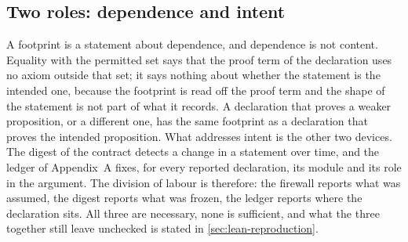 \subsection{Two roles: dependence and intent}

A footprint is a statement about dependence, and dependence is not content.
Equality with the permitted set says that the proof term of the declaration uses
no axiom outside that set; it says nothing about whether the statement is the
intended one, because the footprint is read off the proof term and the shape of
the statement is not part of what it records. A declaration that proves a weaker
proposition, or a different one, has the same footprint as a declaration that
proves the intended proposition. What addresses intent is the other two devices.
The digest of the contract detects a change in a statement over time, and the
ledger of Appendix~A fixes, for every reported declaration, its module and its
role in the argument. The division of labour is therefore: the firewall reports
what was assumed, the digest reports what was frozen, the ledger reports where
the declaration sits. All three are necessary, none is sufficient, and what the
three together still leave unchecked is stated in \cref{sec:lean-reproduction}.
